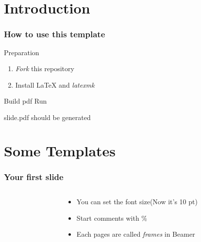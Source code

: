 \section{Introduction}

\begin{frame}
  \frametitle{How to use this template} 

  \begin{block}{Preparation}
    \begin{enumerate}
    \item
      \emph{Fork} this repository
    \item
      Install \LaTeX{} and \emph{latexmk}
    \end{enumerate}
  \end{block}

  \begin{block}{Build pdf}
    Run \hbox{}
    \begin{itemize}
      \thusitem slide.pdf should be generated
    \end{itemize}  
  \end{block}
\end{frame}

\section{Some Templates}

\begin{frame}[fragile]
  \frametitle{Your first slide}
  \begin{columns}
    \begin{column}{0.55\textwidth}
      
    \end{column}
    \begin{column}{0.45\textwidth}
      \begin{itemize}
      \item
        You can set the font size{\footnotesize (Now it's 10 pt)}
      \item
        Start comments with \alert{\%}
      \item 
        Each pages are called \emph{frames} in Beamer
      \end{itemize}
    \end{column}
  \end{columns}

\end{frame}

